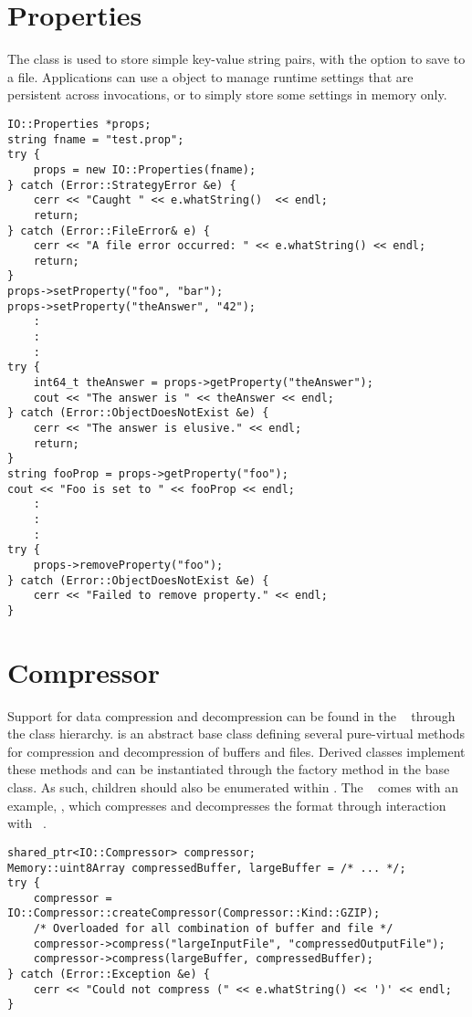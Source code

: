 \section{Properties}
\label{sec-properties}
The  class is used to store simple key-value string pairs, with the
option to save to a file. Applications can use a  object to manage
runtime settings that are persistent across invocations, or to simply store
some settings in memory only.

\begin{lstlisting}[caption={Using a \class{Properties} Object}, label=lst:propertiesuse]
IO::Properties *props;
string fname = "test.prop";
try {
    props = new IO::Properties(fname);
} catch (Error::StrategyError &e) {
    cerr << "Caught " << e.whatString()  << endl;
    return;
} catch (Error::FileError& e) {
    cerr << "A file error occurred: " << e.whatString() << endl;
    return;
}
props->setProperty("foo", "bar");
props->setProperty("theAnswer", "42");
    :
    :
    :
try {
    int64_t theAnswer = props->getProperty("theAnswer");
    cout << "The answer is " << theAnswer << endl;
} catch (Error::ObjectDoesNotExist &e) {
    cerr << "The answer is elusive." << endl;
    return;
}
string fooProp = props->getProperty("foo");
cout << "Foo is set to " << fooProp << endl;
    :
    :
    :
try {
    props->removeProperty("foo");
} catch (Error::ObjectDoesNotExist &e) {
    cerr << "Failed to remove property." << endl;
}
\end{lstlisting}

\section{Compressor}
\label{sec-compressor}

Support for data compression and decompression can be found in the
\lname~ through the  class hierarchy.   is
an abstract base class defining several pure-virtual methods for compression
and decompression of buffers and files.  Derived classes implement these methods
and can be instantiated through the factory method in the base class.
As such, children should also be enumerated within . 
The \lname~ comes with an example, , which compresses and
decompresses the  format through interaction with
~\cite{zlib}.

\begin{lstlisting}[caption={Using a \class{Compressor} Object}, label=lst:compressoruse]
shared_ptr<IO::Compressor> compressor;
Memory::uint8Array compressedBuffer, largeBuffer = /* ... */;
try {
	compressor = IO::Compressor::createCompressor(Compressor::Kind::GZIP);
	/* Overloaded for all combination of buffer and file */
	compressor->compress("largeInputFile", "compressedOutputFile");
	compressor->compress(largeBuffer, compressedBuffer);
} catch (Error::Exception &e) {
	cerr << "Could not compress (" << e.whatString() << ')' << endl;
}
\end{lstlisting}

